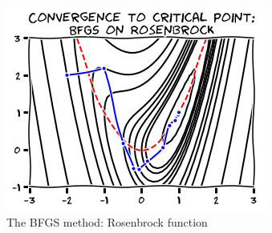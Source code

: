 \begin{example}
\begin{figure}[ht!]
\includegraphics[width=0.65\linewidth]{images/bfgs.png}
\caption{The BFGS method: Rosenbrock function}
\label{figure:BFGS}
\end{figure}
\end{example}






